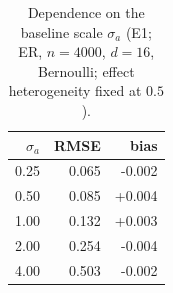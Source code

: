 \begin{table}[h]\centering\footnotesize
\caption{Dependence on the baseline scale $\sigma_a$ (E1; ER, $n=4000$, $d=16$, Bernoulli; effect heterogeneity fixed at $0.5$).}
\label{tab:siga}\begin{tabular}{rrr}\toprule
$\sigma_a$ & RMSE & bias \\
\midrule
0.25 & 0.065 & -0.002 \\
0.50 & 0.085 & +0.004 \\
1.00 & 0.132 & +0.003 \\
2.00 & 0.254 & -0.004 \\
4.00 & 0.503 & -0.002 \\
\bottomrule\end{tabular}\end{table}
